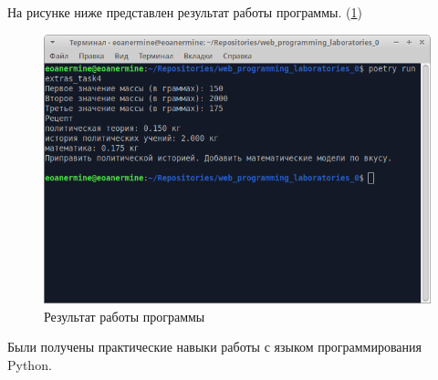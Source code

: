 \documentclass[14pt]{extarticle}
\makeatletter
\newcounter{sectionc} %
\newcommand{\nonumbersections}{\renewcommand{\Hy@numberline}[1]{}}
\let\oldsectionc\sectionc
\renewcommand{\sectionc}{\nonumbersections\oldsectionc}
\makeatother
\begin{document}
На рисунке ниже представлен результат работы программы. (\ref{img:main_extras4})

\begin{figure}[H]
    \centering
    \includegraphics[width=1.0\linewidth]{main_extras4.png}
    \caption{Результат работы программы\label{img:main_extras4}}
\end{figure}


Были получены практические навыки работы с языком программирования Python.
\end{document}
